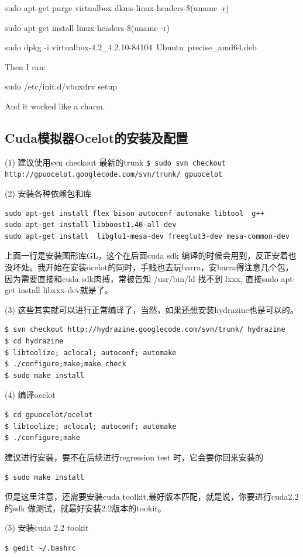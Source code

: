 sudo apt-get purge virtualbox dkms linux-headers-\$(uname -r)

sudo apt-get install linux-headers-\$(uname -r)

sudo dpkg -i virtualbox-4.2\_4.2.10-84104~Ubuntu~precise\_amd64.deb

Then I ran:

sudo /etc/init.d/vboxdrv setup

And it worked like a charm.


\subsection{Cuda模拟器Ocelot的安装及配置}
(1) 建议使用svn checkout 最新的trunk
\verb"$ sudo svn checkout http://gpuocelot.googlecode.com/svn/trunk/ gpuocelot"
 
(2) 安装各种依赖包和库
\begin{verbatim}
sudo apt-get install flex bison autoconf automake libtool  g++
sudo apt-get install libboost1.40-all-dev
sudo apt-get install  libglu1-mesa-dev freeglut3-dev mesa-common-dev 
\end{verbatim}

上面一行是安装图形库GL，这个在后面cuda sdk 编译的时候会用到，反正安着也没坏处。我开始在安装ocelot的同时，手贱也去玩barra，安barra得注意几个包，因为需要直接和cuda sdk肉搏，常被告知 /usr/bin/ld 找不到 lxxx, 直接sudo apt-get install libxxx-dev就是了。

(3) 这些其实就可以进行正常编译了，当然，如果还想安装hydrazine也是可以的。
\begin{verbatim}
$ svn checkout http://hydrazine.googlecode.com/svn/trunk/ hydrazine
$ cd hydrazine
$ libtoolize; aclocal; autoconf; automake
$ ./configure;make;make check
$ sudo make install
\end{verbatim}

(4) 编译ocelot
\begin{verbatim}
$ cd gpuocelot/ocelot
$ libtoolize; aclocal; autoconf; automake
$ ./configure;make
\end{verbatim}

建议进行安装，要不在后续进行regression test 时，它会要你回来安装的

\verb"$ sudo make install"

但是这里注意，还需要安装cuda toolkit,最好版本匹配，就是说，你要进行cuda2.2的sdk 做测试，就最好安装2.2版本的tookit。

(5) 安装cuda 2.2 tookit

\verb"$ gedit ~/.bashrc"

